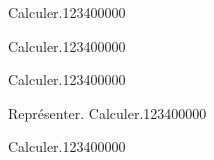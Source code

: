 \begin{pageAD}
\begin{ExoCad}{Calculer.}{1234}{0}{0}{0}{0}{0}
 
\end{ExoCad}




\begin{ExoCad}{Calculer.}{1234}{0}{0}{0}{0}{0}

 

 
\end{ExoCad}

\begin{ExoCad}{Calculer.}{1234}{0}{0}{0}{0}{0}




\end{ExoCad}



\begin{ExoCad}{Représenter. Calculer.}{1234}{0}{0}{0}{0}{0}

 
 


 
\end{ExoCad}

\begin{ExoCad}{Calculer.}{1234}{0}{0}{0}{0}{0}

  
 

\end{ExoCad}

 
\end{pageAD}


